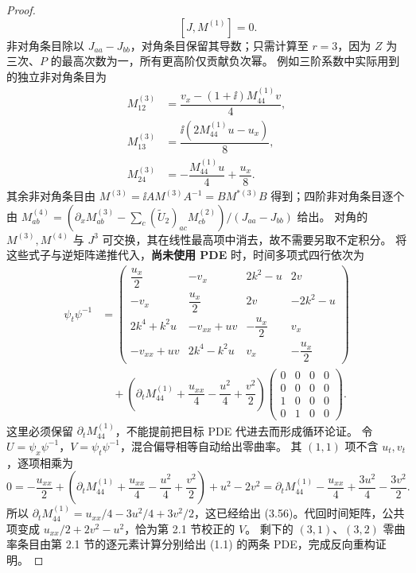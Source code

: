 \begin{proof}
\[\qquad [J,M^{(1)}]=0.
\]
非对角条目除以 $J_{aa}-J_{bb}$，对角条目保留其导数；只需计算至 $r=3$，因为 $Z$ 为三次、$P$ 的最高次数为一，所有更高阶仅贡献负次幂。
例如三阶系数中实际用到的独立非对角条目为
\[
\begin{aligned}
M_{12}^{(3)}&=\dfrac{v_x-(1+\ii)M_{44}^{(1)}v}{4},\\
M_{13}^{(3)}&=\dfrac{\ii(2M_{44}^{(1)}u-u_x)}8,\\
M_{24}^{(3)}&=-\dfrac{M_{44}^{(1)}u}4+\dfrac{u_x}{8}.
\end{aligned}
\]
其余非对角条目由 $M^{(3)}=\ii A M^{(3)}A^{-1}=BM^{*(3)}B$ 得到；四阶非对角条目逐个由
$\displaystyle M_{ab}^{(4)}=(\partial_xM_{ab}^{(3)}-\sum\limits_c(\widetilde U_2)_{ac}M_{cb}^{(2)})/(J_{aa}-J_{bb})$ 给出。
对角的 $M^{(3)},M^{(4)}$ 与 $J^3$ 可交换，其在线性最高项中消去，故不需要另取不定积分。
将这些式子与逆矩阵递推代入，\textbf{尚未使用 PDE} 时，时间多项式四行依次为
\[
\begin{aligned}
\psi_t\psi^{-1}&=\begin{pmatrix}
\dfrac{u_x}{2}&-v_x&2k^2-u&2v\\
-v_x&\dfrac{u_x}{2}&2v&-2k^2-u\\
2k^4+k^2u&-v_{xx}+uv&-\dfrac{u_x}{2}&v_x\\
-v_{xx}+uv&2k^4-k^2u&v_x&-\dfrac{u_x}{2}
\end{pmatrix}\\
&\quad+\left(\partial_tM_{44}^{(1)}+\dfrac{u_{xx}}{4}-\dfrac{u^2}{4}+\dfrac{v^2}{2}\right)
\begin{pmatrix}0&0&0&0\\0&0&0&0\\1&0&0&0\\0&1&0&0\end{pmatrix}.
\end{aligned}
\]
这里必须保留 $\partial_tM_{44}^{(1)}$，不能提前把目标 PDE 代进去而形成循环论证。
令 $U=\psi_x\psi^{-1}$，$V=\psi_t\psi^{-1}$，混合偏导相等自动给出零曲率。
其 $(1,1)$ 项不含 $u_t,v_t$，逐项相乘为
\[
0=-\dfrac{u_{xx}}2+
\left(\partial_tM_{44}^{(1)}+\dfrac{u_{xx}}4-\dfrac{u^2}{4}+\dfrac{v^2}{2}\right)
+u^2-2v^2
=\partial_tM_{44}^{(1)}-\dfrac{u_{xx}}4+\dfrac{3u^2}{4}-\dfrac{3v^2}{2}.
\]
所以 $\partial_tM_{44}^{(1)}=u_{xx}/4-3u^2/4+3v^2/2$，这已经给出 (3.56)。代回时间矩阵，公共项变成 $u_{xx}/2+2v^2-u^2$，恰为第 2.1 节校正的 $V$。
剩下的 $(3,1)$、$(3,2)$ 零曲率条目由第 2.1 节的逐元素计算分别给出 (1.1) 的两条 PDE，完成反向重构证明。
\end{proof}
\begin{note}
\end{note}
